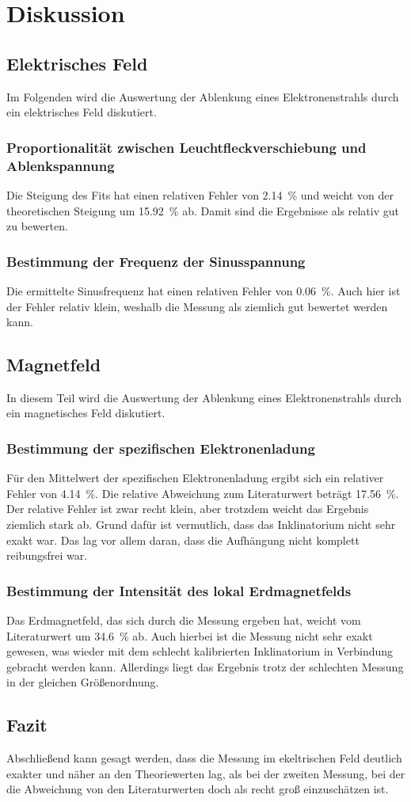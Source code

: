 \section{Diskussion}
\label{sec:Diskussion}

\subsection{Elektrisches Feld}
Im Folgenden wird die Auswertung der Ablenkung eines Elektronenstrahls durch ein elektrisches Feld diskutiert. 

\subsubsection{Proportionalität zwischen Leuchtfleckverschiebung und Ablenkspannung}
Die Steigung des Fits hat einen relativen Fehler von \SI{2.14}{\percent} und weicht von der 
theoretischen Steigung um \SI{15.92}{\percent} ab. Damit sind die Ergebnisse als relativ gut zu bewerten.

\subsubsection{Bestimmung der Frequenz der Sinusspannung}
Die ermittelte Sinusfrequenz hat einen relativen Fehler von \SI{0.06}{\percent}. Auch hier ist der Fehler relativ klein, 
weshalb die Messung als ziemlich gut bewertet werden kann. 


\subsection{Magnetfeld}
In diesem Teil wird die Auswertung der Ablenkung eines Elektronenstrahls durch ein magnetisches Feld diskutiert. 

\subsubsection{Bestimmung der spezifischen Elektronenladung}
Für den Mittelwert der spezifischen Elektronenladung ergibt sich ein relativer Fehler von \SI{4.14}{\percent}. Die relative 
Abweichung zum Literaturwert beträgt \SI{17.56}{\percent}. Der relative Fehler ist zwar recht klein, aber trotzdem weicht das Ergebnis 
ziemlich stark ab. 
Grund dafür ist vermutlich, dass das Inklinatorium nicht sehr exakt war. Das lag vor allem daran, dass die Aufhängung nicht komplett reibungsfrei war. 


\subsubsection{Bestimmung der Intensität des lokal Erdmagnetfelds}
Das Erdmagnetfeld, das sich durch die Messung ergeben hat, weicht vom Literaturwert um \SI{34.6}{\percent} ab. Auch hierbei ist die Messung 
nicht sehr exakt gewesen, was wieder mit dem schlecht kalibrierten Inklinatorium in Verbindung gebracht werden kann.
Allerdings liegt das Ergebnis trotz der schlechten Messung in der gleichen Größenordnung.

\subsection{Fazit}
Abschließend kann gesagt werden, dass die Messung im ekeltrischen Feld deutlich exakter und näher an den Theoriewerten lag, als bei der 
zweiten Messung, bei der die Abweichung von den Literaturwerten doch als recht groß einzuschätzen ist. 
